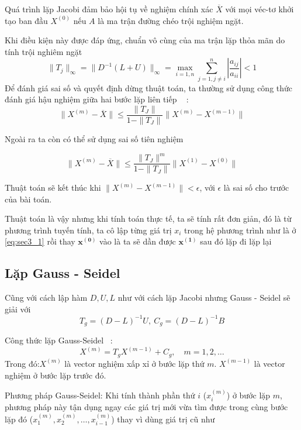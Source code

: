 Quá trình lặp Jacobi đảm bảo hội tụ về nghiệm chính xác $\overline{X}$ với mọi véc-tơ khởi tạo ban đầu $X^{(0)}$ nếu $A$ là ma trận đường chéo trội nghiệm ngặt.

Khi điều kiện này được đáp ứng, chuẩn vô cùng của ma trận lặp thỏa mãn do tính trội nghiêm ngặt ~\cite{dau2026hephuongtrinh}
\begin{equation}
    \|T_{j}\|_{\infty }=\|D^{-1}(L+U)\|_{\infty }=\max _{i=1,n}\sum _{j=1,j\ne i}^{n}\left|\frac{a_{ij}}{a_{ii}}\right|<1
\end{equation}
Để đánh giá sai số và quyết định dừng thuật toán, ta thường sử dụng công thức đánh giá hậu nghiệm giữa hai bước lặp liên tiếp ~\cite{dau2026hephuongtrinh} :
\begin{equation}
    \|X^{(m)} - \overline{X}\| \le \frac{\|T_J\|}{1 - \|T_J\|} \|X^{(m)} - X^{(m-1)}\|
\end{equation}

Ngoài ra ta còn có thể sử dụng sai số tiên nghiệm ~\cite{dau2026hephuongtrinh}

\begin{equation}
    \|X^{(m)} - \overline{X}\| \le \frac{\|T_J\|^m}{1 - \|T_J\|} \|X^{(1)} - X^{(0)}\|
\end{equation}

Thuật toán sẽ kết thúc khi $\|X^{(m)} - X^{(m-1)}\| < \epsilon$, với $\epsilon$ là sai số cho trước của bài toán.

Thuật toán là vậy nhưng khi tính toán thực tế, ta sẽ tính rất đơn giản, đó là từ phương trình tuyến tính, ta cô lập từng giá trị $x_i$ trong hệ phương trình như là ở \ref{eq:sec3_1} rồi thay $\mathbf{x^{(0)}}$ vào là ta sẽ dần được $\mathbf{x^{(1)}}$ sau đó lặp đi lặp lại

\subsection{Lặp Gauss - Seidel}

Cũng với cách lập hàm $D,U,L$ như với cách lặp Jacobi nhưng Gauss - Seidel sẽ giải với  $$T_g = (D - L)^{-1}U, \ C_g = (D - L)^{-1}B$$

Công thức lặp Gauss-Seidel ~\cite{dau2026hephuongtrinh}:$$X^{(m)}=T_{g}X^{(m-1)}+C_{g},\quad m=1,2,\dots $$Trong đó:\(X^{(m)}\) là vector nghiệm xấp xỉ ở bước lặp thứ $m$. \(X^{(m-1)}\) là vector nghiệm ở bước lặp trước đó.

Phương pháp Gauss-Seidel: Khi tính thành phần thứ \(i\) (\(x_{i}^{(m)}\)) ở bước lặp \(m\), phương pháp này tận dụng ngay các giá trị mới vừa tìm được trong cùng bước lặp đó (\(x_1^{(m)}, x_2^{(m)}, \dots, x_{i-1}^{(m)}\)) thay vì dùng giá trị cũ như 

